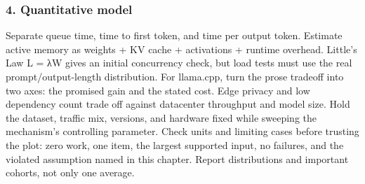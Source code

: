 \subsubsection*{4. Quantitative model}
Separate queue time, time to first token, and time per output token. Estimate active memory as weights + KV cache + activations + runtime overhead. Little's Law L = λW gives an initial concurrency check, but load tests must use the real prompt/output-length distribution.
For llama.cpp, turn the prose tradeoff into two axes: the promised gain and the stated cost. Edge privacy and low dependency count trade off against datacenter throughput and model size. Hold the dataset, traffic mix, versions, and hardware fixed while sweeping the mechanism's controlling parameter.
Check units and limiting cases before trusting the plot: zero work, one item, the largest supported input, no failures, and the violated assumption named in this chapter. Report distributions and important cohorts, not only one average.
